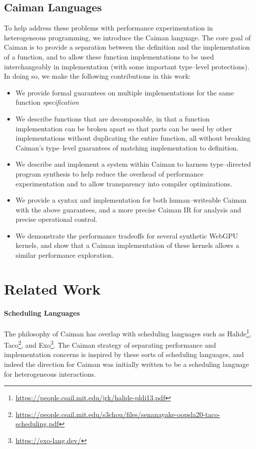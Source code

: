 \subsection{Caiman Languages}

To help address these problems with performance experimentation in heterogeneous programming, we introduce the Caiman language.  The core goal of Caiman is to provide a separation between the definition and the implementation of a function, and to allow these function implementations to be used interchangeably in implementation (with some important type--level protections).  In doing so, we make the following contributions in this work:
\begin{itemize}
\item We provide formal guarantees on multiple implementations for the same function \emph{specification}
\item We describe functions that are decomposable, in that a function implementation can be broken apart so that parts can be used by other implementations without duplicating the entire function, all without breaking Caiman's type--level guarantees of matching implementation to definition.
\item We describe and implement a system within Caiman to harness type--directed program synthesis to help reduce the overhead of performance experimentation and to allow transparency into compiler optimizations.
\item We provide a syntax and implementation for both human--writeable Caiman with the above guarantees, and a more precise Caiman IR for analysis and precise operational control.
\item We demonstrate the performance tradeoffs for several synthetic WebGPU kernels, and show that a Caiman implementation of these kernels allows a similar performance exploration.
\end{itemize}

\section{Related Work}

\paragraph{Scheduling Languages}

The philosophy of Caiman has overlap with scheduling languages such as Halide\footnote{\url{https://people.csail.mit.edu/jrk/halide-pldi13.pdf}}, Taco\footnote{\url{https://people.csail.mit.edu/s3chou/files/senanayake-oopsla20-taco-scheduling.pdf}}, and Exo\footnote{\url{https://exo-lang.dev/}}.  The Caiman strategy of separating performance and implementation concerns is inspired by these sorts of scheduling languages, and indeed the direction for Caiman was initially written to be a scheduling language for heterogeneous interactions.  

